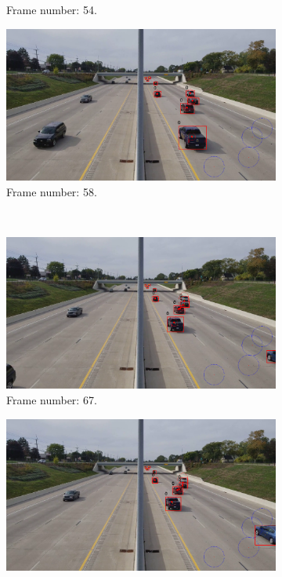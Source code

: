 \begin{figure}[H]
\begin{subfigure}{0.48\textwidth}
        \caption{Frame number: 54.}
        \label{fig:E1-V1-S3:03}
    \end{subfigure}
    \begin{subfigure}{0.48\textwidth}
        \centering
        \includegraphics[width=\linewidth]{../../../experiments/E1/V1/DINO/58}
        \caption{Frame number: 58.}
        \label{fig:E1-V1-S3:04}
    \end{subfigure}
    \\
    \begin{subfigure}{0.48\textwidth}
        \centering
        \includegraphics[width=\linewidth]{../../../experiments/E1/V1/DINO/67}
        \caption{Frame number: 67.}
        \label{fig:E1-V1-S3:05}
    \end{subfigure}
    \begin{subfigure}{0.48\textwidth}
        \centering
        \includegraphics[width=\linewidth]{../../../experiments/E1/V1/DINO/69}

\end{subfigure}
\end{figure}
